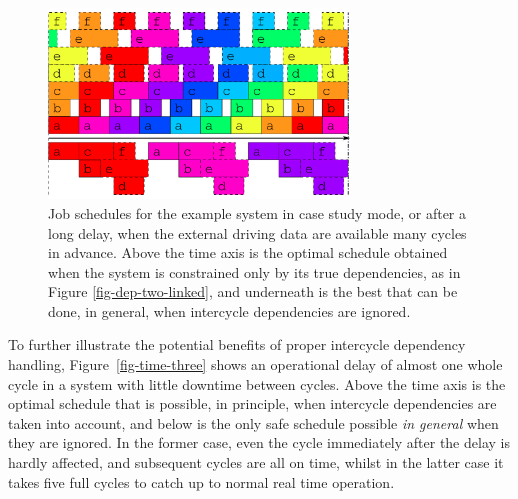 \documentclass[11pt,a4paper]{article}
\begin{document}
\begin{figure}
    \begin{center} 
        \includegraphics[width=8cm]{inkscape-svg/timeline-two}
    \end{center} 
    \caption[Optimal job schedule when all external data is
    available]{\small Job schedules for the example system in case study
    mode, or after a long delay, when the external driving data are
    available many cycles in advance. Above the time axis is the optimal
    schedule obtained when the system is constrained only by its true
    dependencies, as in Figure \ref{fig-dep-two-linked}, and underneath
    is the best that can be done, in general, when intercycle
    dependencies are ignored.} 
    \label{fig-time-two}
\end{figure} 

To further illustrate the potential benefits of proper intercycle
dependency handling, Figure~\ref{fig-time-three} shows an operational
delay of almost one whole cycle in a system with little downtime between
cycles. Above the time axis is the optimal schedule that is possible, in
principle, when intercycle dependencies are taken into account, and
below is the only safe schedule possible {\em in general} when they are
ignored.  In the former case, even the cycle immediately after the delay
is hardly affected, and subsequent cycles are all on time, whilst in the
latter case it takes five full cycles to catch up to normal real time
operation.
\end{document}
